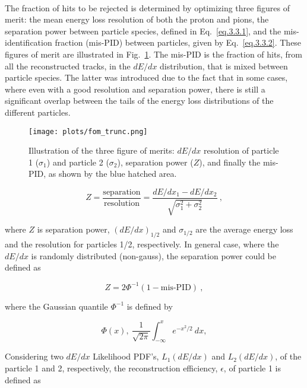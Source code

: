 ~\par The fraction of hits to be rejected is determined by optimizing three figures of merit: the mean energy loss resolution of both the proton and pions, the separation power between particle species, defined in Eq.~\ref{eq.3.3.1}, and the mis-identification fraction (mis-PID) between particles, given by Eq.~\ref{eq.3.3.2}. These figures of merit are illustrated in Fig.~\ref{fig.3.2.3}. The mis-PID is the fraction of hits, from all the reconstructed tracks, in the $dE/dx$ distribution, that is mixed between particle species. The latter was introduced due to the fact that in some cases, where even with a good resolution and separation power, there is still a significant overlap between the tails of the energy loss distributions of the different particles.

\begin{figure}[H]
    \centering
    \texttt{[image: plots/fom\_trunc.png]}
    \caption{\label{fig.3.2.3} Illustration of the three figure of merits: $dE/dx$ resolution of particle 1 ($\sigma_{1}$) and particle 2 ($\sigma_{2}$), separation power ($Z$), and finally the mis-PID, as shown by the blue hatched area.}
\end{figure}

\begin{equation}
    \label{eq.3.3.1}
    Z = \frac{\mathrm{separation}}{\mathrm{resolution}} = \frac{dE/dx_{1} - dE/dx_{2}}{\sqrt{\sigma_{1}^2 + \sigma_{2}^2}}~,
\end{equation}

\noindent where $Z$ is separation power, $(dE/dx)_{1/2}$ and $\sigma_{1/2}$ are the average energy loss and the resolution for particles 1/2, respectively. In general case, where the $dE/dx$ is randomly distributed (non-gauss), the separation power could be defined as 

\begin{equation}
    \label{eq.3.3.2.0.1}
    Z = 2 \Phi^{-1}(1-\mbox{mis-PID})~,
\end{equation}

\noindent where the Gaussian quantile $\Phi^{-1}$ is defined by

\begin{equation}
    \label{eq.3.3.2.0.2}
    \Phi(x),~\frac{1}{\sqrt{2\pi}}\int_{-\infty}^{x} e^{-x^{2}/2}~dx,
\end{equation}

Considering two $dE/dx$ Likelihood PDF's, $L_{1}(dE/dx)$ and $L_{2}(dE/dx)$, of the particle 1 and 2, respectively, the reconstruction efficiency, $\epsilon$, of particle 1 is defined as

